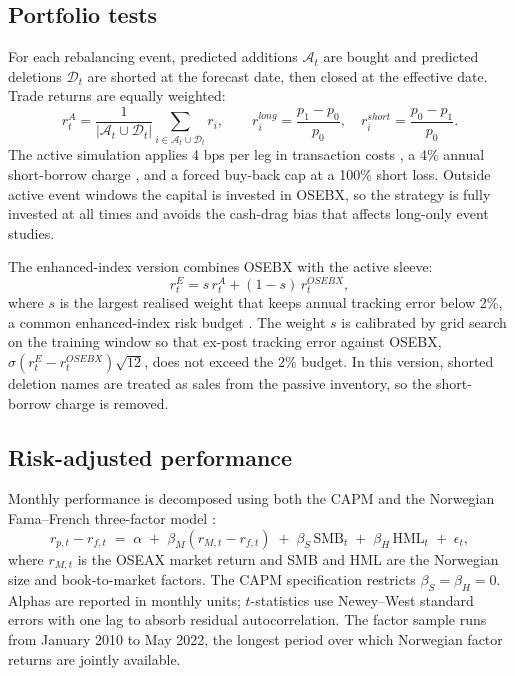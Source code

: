 \subsection{Portfolio tests}

For each rebalancing event, predicted additions $\mathcal{A}_t$ are bought and predicted deletions $\mathcal{D}_t$ are shorted at the forecast date, then closed at the effective date. Trade returns are equally weighted:
\begin{equation}
r_t^A =
\frac{1}{|\mathcal{A}_t \cup \mathcal{D}_t|}
\sum_{i \in \mathcal{A}_t \cup \mathcal{D}_t} r_i,
\qquad
r_i^{long}=\frac{p_1-p_0}{p_0},\quad
r_i^{short}=\frac{p_0-p_1}{p_0}.
\label{eq:retdef}
\end{equation}
The active simulation applies 4 bps per leg in transaction costs \parencite{dnb-transaction-costs}, a 4\% annual short-borrow charge \parencite{nordnet-short-interest-rate}, and a forced buy-back cap at a 100\% short loss. Outside active event windows the capital is invested in OSEBX, so the strategy is fully invested at all times and avoids the cash-drag bias that affects long-only event studies.

The enhanced-index version combines OSEBX with the active sleeve:
\begin{equation}
r_t^E=s\,r_t^A+(1-s)\,r_t^{OSEBX},
\label{eq:enhanced}
\end{equation}
where $s$ is the largest realised weight that keeps annual tracking error below 2\%, a common enhanced-index risk budget \parencite{ssg-tracking-error-enhanced}. The weight $s$ is calibrated by grid search on the training window so that ex-post tracking error against OSEBX, $\sigma(r_t^E-r_t^{OSEBX})\sqrt{12}$, does not exceed the 2\% budget. In this version, shorted deletion names are treated as sales from the passive inventory, so the short-borrow charge is removed.

\subsection{Risk-adjusted performance}

Monthly performance is decomposed using both the CAPM and the Norwegian Fama--French three-factor model \parencite{fama-french-common-risk-factors-in-the-returns-on-stocks-and-bonds,bernt-fama-french}:
\begin{equation}
r_{p,t}-r_{f,t} \;=\; \alpha \;+\; \beta_M\!\left(r_{M,t}-r_{f,t}\right) \;+\; \beta_S\,\mathrm{SMB}_t \;+\; \beta_H\,\mathrm{HML}_t \;+\; \epsilon_t,
\label{eq:ff3}
\end{equation}
where $r_{M,t}$ is the OSEAX market return and SMB and HML are the Norwegian size and book-to-market factors. The CAPM specification restricts $\beta_S=\beta_H=0$. Alphas are reported in monthly units; $t$-statistics use Newey--West standard errors with one lag to absorb residual autocorrelation. The factor sample runs from January 2010 to May 2022, the longest period over which Norwegian factor returns are jointly available.
